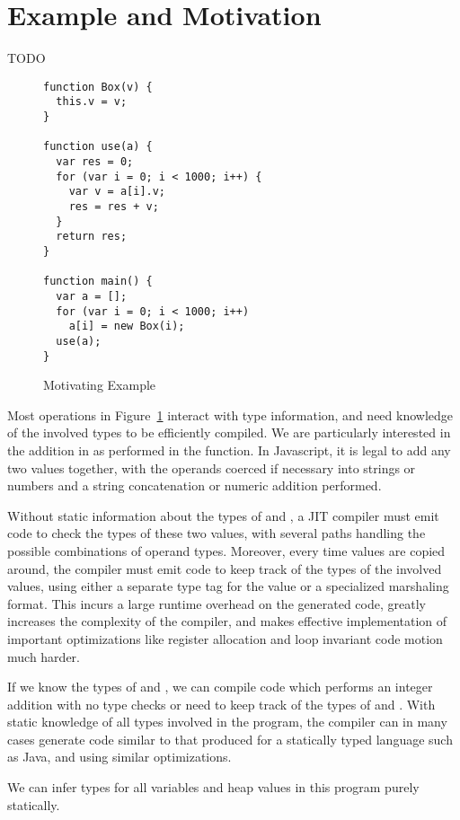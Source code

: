 
\section{Example and Motivation}
\label{sec:example}

TODO

\begin{figure}
\begin{lstlisting}
function Box(v) {
  this.v = v;
}

function use(a) {
  var res = 0;
  for (var i = 0; i < 1000; i++) {
    var v = a[i].v;
    res = res + v;
  }
  return res;
}

function main() {
  var a = [];
  for (var i = 0; i < 1000; i++)
    a[i] = new Box(i);
  use(a);
}
\end{lstlisting}
\caption{Motivating Example}
\label{fig:motivating-example}
\end{figure}

Most operations in Figure~\ref{fig:motivating-example} interact with type information,
and need knowledge of the involved types to be efficiently compiled.
We are particularly interested in the addition in
 as performed in the  function.
In Javascript, it is legal to add any two values together, with the
operands coerced if necessary into strings or numbers and a string
concatenation or numeric addition performed.

Without static information about the types of  and ,
a JIT compiler must emit code to check the types of these two values,
with several paths handling the possible combinations of
operand types.
Moreover, every time values are copied around, the compiler must emit
code to keep track of the types of the involved values, using either
a separate type tag for the value or a specialized marshaling format.
This incurs a large runtime overhead on the generated code,
greatly increases the complexity of the compiler,
and makes effective implementation of important optimizations like
register allocation and loop invariant code motion much harder.

If we know the types of  and , we can compile
code which performs an integer addition with no type checks or need
to keep track of the types of  and .
With static knowledge of all types involved in the program, the compiler can
in many cases generate code similar to that produced for a statically
typed language such as Java, and using similar optimizations.

We can infer types for all variables and heap values in this program
purely statically.

